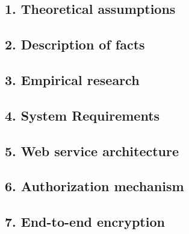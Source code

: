 \subsection*{1. Theoretical assumptions}\label{subsec:theoretical-assumptions}


\subsection*{2. Description of facts}\label{subsec:description-of-facts}


\subsection*{3. Empirical research}\label{subsec:empirical-research}


\subsection*{4. System Requirements}\label{subsec:system-requirements}


\subsection*{5. Web service architecture}\label{subsec:web-service-architecture}


\subsection*{6. Authorization mechanism}\label{subsec:authorization-mechanism}


\subsection*{7. End-to-end encryption}\label{subsec:end-to-end-encryption}
